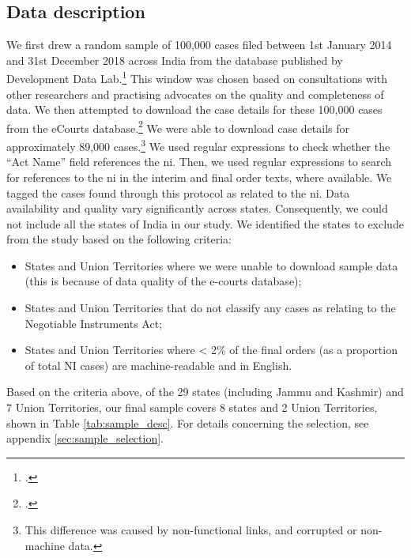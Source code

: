 \subsection{Data description} \label{sec:data-description}

We first drew a random sample of 100,000 cases filed between 1st January 2014 and 31st December 2018 across India from the database published by Development Data Lab.\footcite{devdatalabs2021_eCourtsData} This window was chosen based on consultations with other researchers and practising advocates on the quality and completeness of data. We then attempted to download the case details for these 100,000 cases from the eCourts database.\footcite{ecourts2022} We were able to download case details for approximately 89,000 cases.\footnote{This difference was caused by non-functional links, and corrupted or non-machine data.} We used regular expressions to check whether the ``Act Name'' field references the \gls{ni}. Then, we used regular expressions to search for references to the \gls{ni} in the interim and final order texts, where available. We tagged the cases found through this protocol as related to the \gls{ni}. Data availability and quality vary significantly across states. Consequently, we could not include all the states of India in our study. We identified the states to exclude from the study based on the following criteria:

\begin{itemize}
\item States and Union Territories where we were unable to download sample data (this is because of data quality of the e-courts database);
\item States and Union Territories that do not classify any cases as relating to the Negotiable Instruments Act;
\item States and Union Territories where < 2\% of the final orders (as a proportion of total NI cases) are machine-readable and in English.
\end{itemize}

Based on the criteria above, of the 29 states (including Jammu and Kashmir) and 7 Union Territories, our final sample covers 8 states and 2 Union Territories, shown in Table \ref{tab:sample_desc}. For details concerning the selection, see appendix \ref{sec:sample_selection}.

